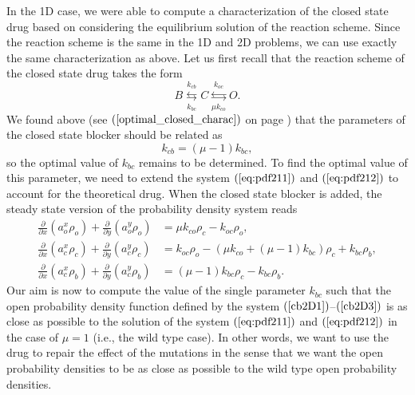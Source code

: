 In the 1D case, we were able to compute a characterization of the closed state
drug based on considering the equilibrium solution of the reaction scheme.
Since the reaction scheme is the same in the 1D and 2D problems, we can
use exactly the same characterization as above. Let us first recall that the
reaction scheme of the closed state drug takes the form%
\[
B\underset{k_{bc}}{\overset{k_{cb}}{\leftrightarrows}}C\underset{\mu k_{co}%
}{\overset{k_{oc}}{\leftrightarrows}}O.
\]
We found above (see $(\ref{optimal_closed_charac})$ on page \pageref{optimal_closed_charac}) that the
parameters of the closed state blocker should be related as
\begin{equation}
k_{cb}=(\mu-1)k_{bc},\label{characterize2D}%
\end{equation}
so the optimal value of $k_{bc}$ remains to be determined. To find the
optimal value of this parameter, we need to extend the system 
$(\ref{eq:pdf211})$ and $(\ref{eq:pdf212})$ to account for the theoretical drug. When the closed state blocker 
is added,
the steady state version of the probability density system reads%
\begin{align}
\frac{\partial}{\partial x}\left(  a_{o}^{x}\rho_{o}\right)  +\frac{\partial
}{\partial y}\left(  a_{o}^{y}\rho_{o}\right)   &  =\mu k_{co}\rho_{c}%
-k_{oc}\rho_{o},\label{cb2D1}\\
\frac{\partial}{\partial x}\left(  a_{c}^{x}\rho_{c}\right)  +\frac{\partial
}{\partial y}\left(  a_{c}^{y}\rho_{c}\right)   &  =k_{oc}\rho_{o}-\left(  \mu
k_{co}+\left(  \mu-1\right)  k_{bc}\right)  \rho_{c}+k_{bc}\rho_{b}%
,\label{cb2D2}\\
\frac{\partial}{\partial x}\left(  a_{c}^{x}\rho_{b}\right)  +\frac{\partial
}{\partial y}\left(  a_{c}^{y}\rho_{b}\right)   &  =\left(  \mu-1\right)
k_{bc}\rho_{c}-k_{bc}\rho_{b}.\label{cb2D3}%
\end{align}
Our aim is now to compute the value of the single parameter $k_{bc}$ such that
the open probability density function defined by the system $(\ref{cb2D1})$--$(\ref{cb2D3})$ is as close as
possible to the solution of the system $(\ref{eq:pdf211})$ and $(\ref{eq:pdf212})$ in
the case of $\mu=1$ (i.e., the wild type case). In other words, we want to use the drug to repair the effect of
the mutations in the sense that we want the open probability densities to be as close
as possible to the wild type open probability densities.


